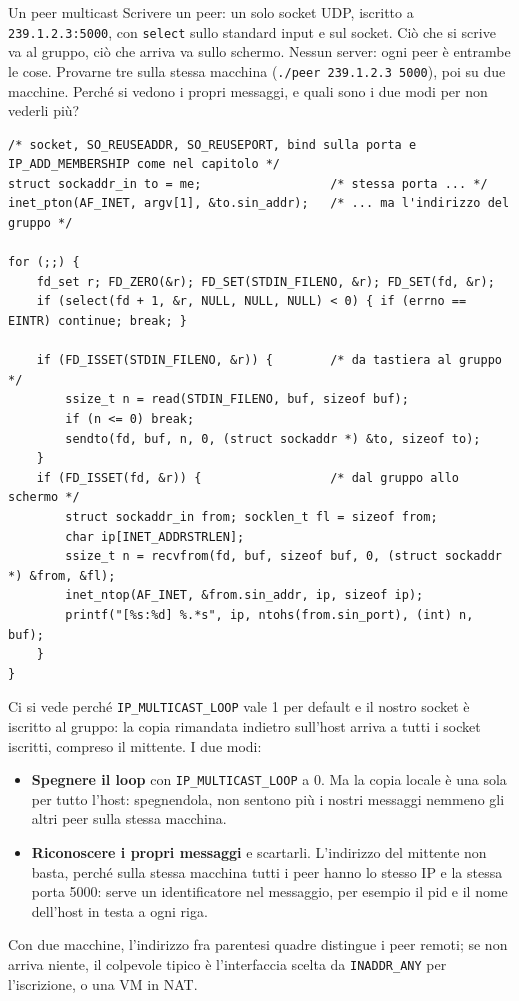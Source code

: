 \begin{esercizio}{Un peer multicast}
Scrivere un peer: un solo socket UDP, iscritto a \texttt{239.1.2.3:5000}, con \texttt{select} sullo standard input e sul
socket. Ciò che si scrive va al gruppo, ciò che arriva va sullo schermo. Nessun server: ogni peer è entrambe le cose.
Provarne tre sulla stessa macchina (\texttt{./peer 239.1.2.3 5000}), poi su due macchine. Perché si vedono i propri
messaggi, e quali sono i due modi per non vederli più?

\svolgimento
\begin{lstlisting}[language={[POSIX]C}, style=wnumbers, title={peer.c: il cuore}]
/* socket, SO_REUSEADDR, SO_REUSEPORT, bind sulla porta e IP_ADD_MEMBERSHIP come nel capitolo */
struct sockaddr_in to = me;                  /* stessa porta ... */
inet_pton(AF_INET, argv[1], &to.sin_addr);   /* ... ma l'indirizzo del gruppo */

for (;;) {
    fd_set r; FD_ZERO(&r); FD_SET(STDIN_FILENO, &r); FD_SET(fd, &r);
    if (select(fd + 1, &r, NULL, NULL, NULL) < 0) { if (errno == EINTR) continue; break; }

    if (FD_ISSET(STDIN_FILENO, &r)) {        /* da tastiera al gruppo */
        ssize_t n = read(STDIN_FILENO, buf, sizeof buf);
        if (n <= 0) break;
        sendto(fd, buf, n, 0, (struct sockaddr *) &to, sizeof to);
    }
    if (FD_ISSET(fd, &r)) {                  /* dal gruppo allo schermo */
        struct sockaddr_in from; socklen_t fl = sizeof from;
        char ip[INET_ADDRSTRLEN];
        ssize_t n = recvfrom(fd, buf, sizeof buf, 0, (struct sockaddr *) &from, &fl);
        inet_ntop(AF_INET, &from.sin_addr, ip, sizeof ip);
        printf("[%s:%d] %.*s", ip, ntohs(from.sin_port), (int) n, buf);
    }
}
\end{lstlisting}

Ci si vede perché \texttt{IP\_MULTICAST\_LOOP} vale 1 per default e il nostro socket è iscritto al gruppo: la copia
rimandata indietro sull'host arriva a tutti i socket iscritti, compreso il mittente. I due modi:
\begin{itemize}
    \item \textbf{Spegnere il loop} con \texttt{IP\_MULTICAST\_LOOP} a 0. Ma la copia locale è una sola per tutto l'host:
          spegnendola, non sentono più i nostri messaggi nemmeno gli altri peer sulla stessa macchina.
    \item \textbf{Riconoscere i propri messaggi} e scartarli. L'indirizzo del mittente non basta, perché sulla stessa
          macchina tutti i peer hanno lo stesso IP e la stessa porta 5000: serve un identificatore nel messaggio, per
          esempio il pid e il nome dell'host in testa a ogni riga.
\end{itemize}
Con due macchine, l'indirizzo fra parentesi quadre distingue i peer remoti; se non arriva niente, il colpevole tipico è
l'interfaccia scelta da \texttt{INADDR\_ANY} per l'iscrizione, o una VM in NAT.
\end{esercizio}

